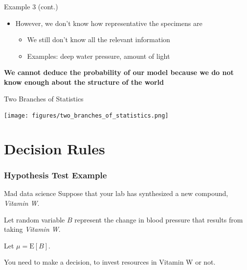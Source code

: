 \documentclass[12pt, block=fill]{beamer}
\newcommand{\E}{\text{E}}
\begin{document}
\begin{frame}{Example 3 (cont.)}
  
    \begin{itemize}
        \item However, we don't know how representative the specimens are
        \begin{itemize}
            \item We still don't know all the relevant information
            \item Examples: deep water pressure, amount of light
        \end{itemize}
  \end{itemize}    
  \textbf{We cannot deduce the probability of our model because we do not know enough about the structure of the world} 
\end{frame}


\begin{frame}{Two Branches of Statistics}
    \begin{center}
        \texttt{[image: figures/two\_branches\_of\_statistics.png]}
    \end{center}
\end{frame}















\section{Decision Rules}

\begin{frame}
  \frametitle{Hypothesis Test Example}

  \begin{exampleblock}{Mad data science}
    Suppose that your lab has synthesized a new compound, 
    \textit{Vitamin W}.

    Let random variable $B$ represent the change in blood pressure that results from taking
    \textit{Vitamin W}.
    
    Let $\mu = \E[B]$.

    You need to make a decision, to invest resources in Vitamin W or not. 
  \end{exampleblock}
  
   
 \end{frame}
\end{document}
